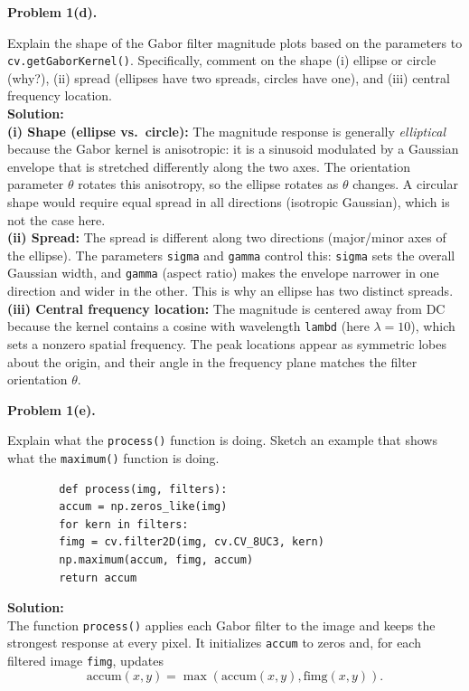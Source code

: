 \documentclass[11pt]{article}
\begin{document}
	\newpage
	
	\textbf{Problem 1(d).}
	
	Explain the shape of the Gabor filter magnitude plots based on the parameters to \texttt{cv.getGaborKernel()}. Specifically, comment on the shape (i) ellipse or circle (why?), (ii) spread (ellipses have two spreads, circles have one), and (iii) central frequency location.\\
	
	\textbf{Solution:}\\
	\textbf{(i) Shape (ellipse vs.\ circle):} The magnitude response is generally \emph{elliptical} because the Gabor kernel is anisotropic: it is a sinusoid modulated by a Gaussian envelope that is stretched differently along the two axes. The orientation parameter $\theta$ rotates this anisotropy, so the ellipse rotates as $\theta$ changes. A circular shape would require equal spread in all directions (isotropic Gaussian), which is not the case here.\\
	
	\textbf{(ii) Spread:} The spread is different along two directions (major/minor axes of the ellipse). The parameters \texttt{sigma} and \texttt{gamma} control this: \texttt{sigma} sets the overall Gaussian width, and \texttt{gamma} (aspect ratio) makes the envelope narrower in one direction and wider in the other. This is why an ellipse has two distinct spreads.\\
	
	\textbf{(iii) Central frequency location:} The magnitude is centered away from DC because the kernel contains a cosine with wavelength \texttt{lambd} (here $\lambda=10$), which sets a nonzero spatial frequency. The peak locations appear as symmetric lobes about the origin, and their angle in the frequency plane matches the filter orientation $\theta$.
	
	\newpage
	
	\textbf{Problem 1(e).}
	
	Explain what the \texttt{process()} function is doing. Sketch an example that shows what the \texttt{maximum()} function is doing.
	
	\begin{verbatim}
		def process(img, filters):
		accum = np.zeros_like(img)
		for kern in filters:
		fimg = cv.filter2D(img, cv.CV_8UC3, kern)
		np.maximum(accum, fimg, accum)
		return accum
	\end{verbatim}
	
	\textbf{Solution:}\\
	The function \texttt{process()} applies each Gabor filter to the image and keeps the strongest response at every pixel. It initializes \texttt{accum} to zeros and, for each filtered image \texttt{fimg}, updates
	\[
	\text{accum}(x,y) = \max(\text{accum}(x,y), \text{fimg}(x,y)).
	\]
	
\end{document}
